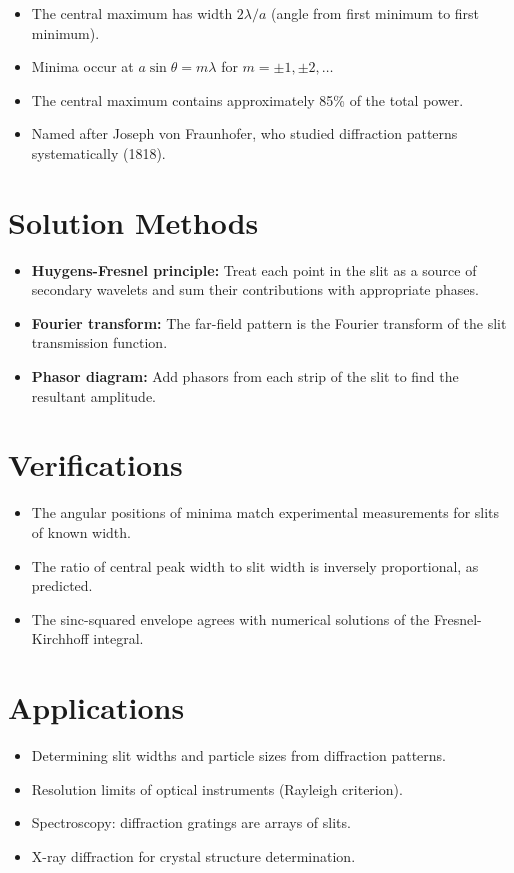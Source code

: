 \begin{itemize}
    \item The central maximum has width $2\lambda/a$ (angle from first minimum to first minimum).
    \item Minima occur at $a\sin\theta = m\lambda$ for $m = \pm 1, \pm 2, \ldots$
    \item The central maximum contains approximately 85\% of the total power.
    \item Named after Joseph von Fraunhofer, who studied diffraction patterns systematically (1818).
\end{itemize}
\section*{Solution Methods}

\begin{itemize}
    \item \textbf{Huygens-Fresnel principle:} Treat each point in the slit as a source of secondary wavelets and sum their contributions with appropriate phases.
    \item \textbf{Fourier transform:} The far-field pattern is the Fourier transform of the slit transmission function.
    \item \textbf{Phasor diagram:} Add phasors from each strip of the slit to find the resultant amplitude.
\end{itemize}
\section*{Verifications}

\begin{itemize}
    \item The angular positions of minima match experimental measurements for slits of known width.
    \item The ratio of central peak width to slit width is inversely proportional, as predicted.
    \item The sinc-squared envelope agrees with numerical solutions of the Fresnel-Kirchhoff integral.
\end{itemize}
\section*{Applications}

\begin{itemize}
    \item Determining slit widths and particle sizes from diffraction patterns.
    \item Resolution limits of optical instruments (Rayleigh criterion).
    \item Spectroscopy: diffraction gratings are arrays of slits.
    \item X-ray diffraction for crystal structure determination.
\end{itemize}
